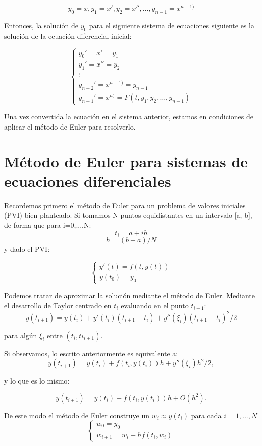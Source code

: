 \documentclass[12pt]{article}       %
\begin{document}
$$y_0 = x, y_1 = x', y_2 = x'', \dots, y_{n-1} = x^{n-1)}$$

Entonces, la solución de $y_0$ para el siguiente sistema de ecuaciones siguiente es la solución de la ecuación diferencial inicial:

$$
\begin{cases}
y_0' = x' = y_1\\
y_1' = x'' = y_2\\
\vdots\\
y_{n-2}' = x^{n-1)} = y_{n-1}\\
y_{n-1}' = x^{n)} = F(t, y_1, y_2, \dots, y_{n-1})
\end{cases}
$$

Una vez convertida la ecuación en el sistema anterior, estamos en condiciones de aplicar el método de Euler para resolverlo.

\section{Método de Euler para sistemas de ecuaciones diferenciales}

Recordemos primero el método de Euler para un problema de valores iniciales (PVI) bien planteado. Si tomamos N puntos equidistantes en un intervalo [a, b], de forma que para i=0,...,N:
$$
t_i=a+ih
$$
$$
h=(b-a)/N
$$
y dado el PVI:

$$
\begin{cases}
y'(t)=f(t,y(t)) \\ 
y(t_0)=y_0
\end{cases}
$$

Podemos tratar de aproximar la solución mediante el método de Euler. Mediante el desarrollo de Taylor centrado en $t_i$ evaluando en el punto $t_{i+1}$:
$$
y(t_{i+1})=y(t_i) + y'(t_i)(t_{i+1}-t_i) + y''(\xi_i)(t_{i+1}-t_i)^2/2
$$

para algún $\xi_i$ entre $(t_i, ti_{i+1})$.

Si observamos, lo escrito anteriormente es equivalente a:
$$
y(t_{i+1})=y(t_i) + f(t_i,y(t_i))h + y''(\xi_i)h^2/2,
$$ 

y lo que es lo mismo:

$$
y(t_{i+1})=y(t_i) + f(t_i,y(t_i))h + O(h^2).
$$

De este modo el método de Euler construye un $w_i \approx y(t_i)$ para cada $i=1,...,N$
$$
\begin{cases}
w_0=y_0\\
w_{i+1}=w_i + hf(t_i,w_i)
\end{cases}
$$
\end{document}
